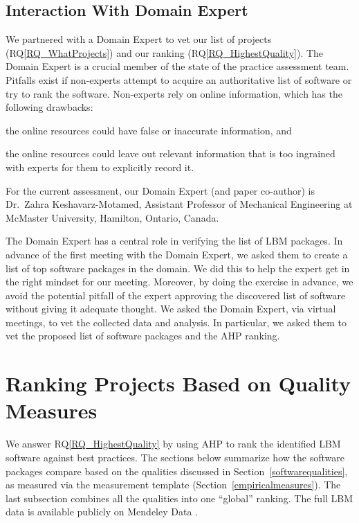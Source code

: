 \documentclass[final, 3p, times, authoryear]{elsarticle}
\newcommand{\rqref}[1]{RQ\ref{#1}}
\begin{document}
\subsection{Interaction With Domain Expert} \label{sec_vet_software_list}

We partnered with a Domain Expert to vet our list of projects
(\rqref{RQ_WhatProjects}) and our ranking (\rqref{RQ_HighestQuality}). The
Domain Expert is a crucial member of the state of the practice assessment team.
Pitfalls exist if non-experts attempt to acquire an authoritative list of
software or try to rank the software. Non-experts rely on online information,
which has the following drawbacks:
\begin{inparaenum}[i)]
  \item the online resources could have false or inaccurate information, and 
  \item the online resources could leave out relevant information that is too
  ingrained with experts for them to explicitly record it.
\end{inparaenum}
For the current assessment, our Domain Expert (and paper co-author) is Dr.\
 Zahra Keshavarz-Motamed, Assistant Professor of Mechanical Engineering at
McMaster University, Hamilton, Ontario, Canada.  

The Domain Expert has a central role in verifying the list of LBM packages. In
advance of the first meeting with the Domain Expert, we asked them to create a
list of top software packages in the domain.  We did this to help the expert get
in the right mindset for our meeting.  Moreover, by doing the exercise in
advance, we avoid the potential pitfall of the expert approving the discovered
list of software without giving it adequate thought. We asked the Domain Expert,
via virtual meetings, to vet the collected data and analysis. In particular, we
asked them to vet the proposed list of software packages and the AHP ranking.

\section{Ranking Projects Based on Quality Measures} \label{AHPresults}

We answer \rqref{RQ_HighestQuality} by using AHP to rank the identified LBM
software against best practices.  The sections below summarize how the software
packages compare based on the qualities discussed in
Section~\ref{softwarequalities}, as measured via the measurement template
(Section~\ref{empiricalmeasures}).  The last subsection combines all the
qualities into one ``global'' ranking.  The full LBM data is available publicly
on Mendeley Data \citep{Smith2022}.
\end{document}
